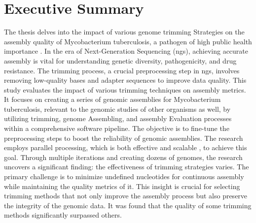 \chapter*{Executive Summary}


The thesis delves into the impact of various \gls{genome} \gls{trimming} Strategies on the \gls{assembly} quality of Mycobacterium tuberculosis, a pathogen of high public health importance \cite{Kemal2018}. In the era of Next-Generation
Sequencing (\gls{ngs}), achieving accurate \gls{assembly} is vital for understanding genetic diversity, pathogenicity, and drug resistance. The trimming process, a crucial preprocessing step in \gls{ngs}, involves removing low-quality bases and adapter sequences to improve data quality. This study evaluates the impact of various trimming techniques on \gls{assembly} metrics. It focuses on creating a series of genomic assemblies for Mycobacterium tuberculosis, relevant to the genomic studies of other organisms as well, by utilizing \gls{trimming}, \gls{genome} Assembling, and \gls{assembly} Evaluation processes within a comprehensive software pipeline. The objective is to fine-tune the preprocessing steps to boost the reliability of genomic assemblies. The research employs parallel processing, which is both effective and scalable \cite{Vishwasrao2017}, to achieve this goal. Through multiple iterations and creating dozens of \gls{genome}s, the research uncovers a significant finding: the effectiveness of trimming strategies varies. The primary challenge is to minimize undefined nucleotides for continuous \gls{assembly} while maintaining the quality metrics of it. This insight is crucial for selecting trimming methods that not only improve the \gls{assembly} process but also preserve the integrity of the genomic data. It was found that the quality of some trimming methods significantly surpassed others.

